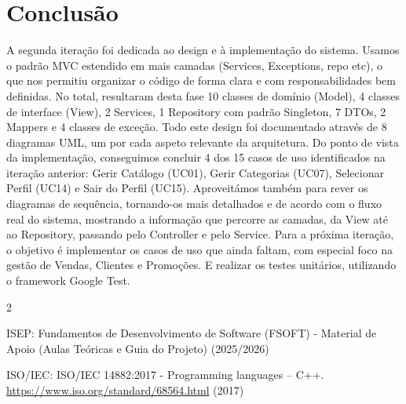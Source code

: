 \documentclass[a4paper]{llncs}
\begin{document}
\section{Conclusão}
A segunda iteração foi dedicada ao design e à implementação do sistema. Usamos o padrão MVC estendido em mais camadas (Services, Exceptions, repo etc), o que nos permitiu organizar o código de forma clara e com responsabilidades bem definidas. No total, resultaram desta fase 10 classes de domínio (Model), 4 classes de interface (View), 2 Services, 1 Repository com padrão Singleton, 7 DTOs, 2 Mappers e 4 classes de exceção. Todo este design foi documentado através de 8 diagramas UML, um por cada aspeto relevante da arquitetura. Do ponto de vista da implementação, conseguimos concluir 4 dos 15 casos de uso identificados na iteração anterior: Gerir Catálogo (UC01), Gerir Categorias (UC07), Selecionar Perfil (UC14) e Sair do Perfil (UC15). Aproveitámos também para rever os diagramas de sequência, tornando-os mais detalhados e de acordo com o fluxo real do sistema, mostrando a informação que percorre as camadas, da View até ao Repository, passando pelo Controller e pelo Service. Para a próxima iteração, o objetivo é implementar os casos de uso que ainda faltam, com especial foco na gestão de Vendas, Clientes e Promoções. E realizar os testes unitários, utilizando o framework Google Test.

\begin{thebibliography}{2}

ISEP: Fundamentos de Desenvolvimento de Software (FSOFT) - Material de Apoio (Aulas Teóricas e Guia do Projeto) (2025/2026)

ISO/IEC: ISO/IEC 14882:2017 - Programming languages -- C++. \url{https://www.iso.org/standard/68564.html} (2017)

\end{thebibliography}
\end{document}
